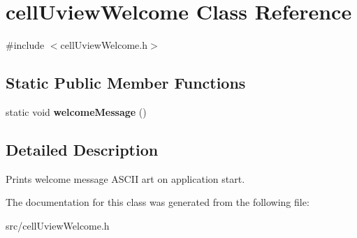 \hypertarget{classcell_uview_welcome}{}\section{cell\+Uview\+Welcome Class Reference}
\label{classcell_uview_welcome}


{\ttfamily \#include $<$cell\+Uview\+Welcome.\+h$>$}

\subsection*{Static Public Member Functions}
\begin{DoxyCompactItemize}
\item 
static void {\bfseries welcome\+Message} ()\hypertarget{classcell_uview_welcome_af2444371dd0d638e07efdcb41eba54aa}{}\label{classcell_uview_welcome_af2444371dd0d638e07efdcb41eba54aa}

\end{DoxyCompactItemize}


\subsection{Detailed Description}
Prints welcome message A\+S\+C\+II art on application start. 

The documentation for this class was generated from the following file\+:\begin{DoxyCompactItemize}
\item 
src/cell\+Uview\+Welcome.\+h\end{DoxyCompactItemize}
